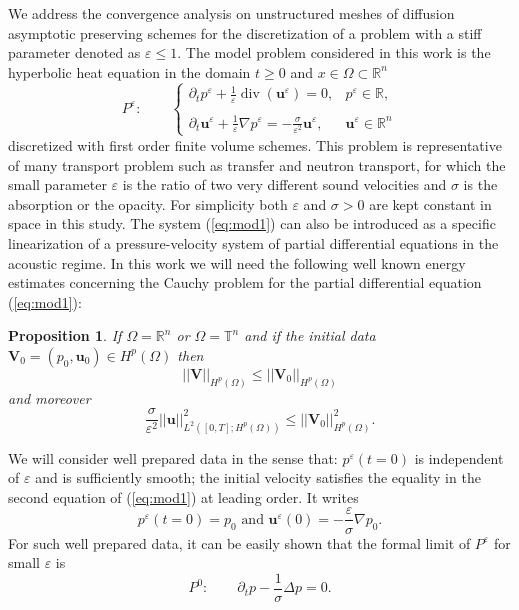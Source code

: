 \documentclass[a4paper,french,english,10pt]{article}
\newcommand\uu{\mathbf{u}}
\newcommand\eps{\varepsilon}
\newcommand{\ds}{\displaystyle}
\newcommand\V{\mathbf{V}}
\newtheorem{proposition}[theorem]{Proposition}
\begin{document}
We address the convergence analysis  on unstructured meshes
of diffusion
asymptotic preserving schemes for the discretization
of a problem with a stiff parameter denoted as $\eps\leq 1$.
The model problem considered in this work
is  the hyperbolic heat equation in the domain 
$t\geq 0$ and  $x\in \Omega\subset \mathbb R^n$
\begin{equation} \label{eq:mod1}
P^\varepsilon: \qquad 
\left\{\begin{array}{ll}
\ds\partial_t p^{\eps}+\frac{1}{\eps}\operatorname{div}(\uu^{\eps})=0,
& p^{\eps}\in \mathbb R, \\
\\
\ds\partial_t \uu^{\eps}+\frac{1}{\eps}\nabla
p^{\eps}=-\frac{\sigma}{\eps^2}\uu^{\eps},
& \uu^{\eps}  \in \mathbb R^n
 \end{array}\right.
\end{equation}
discretized with first order finite volume schemes.
This problem is representative
of many  transport problem such
as transfer and neutron transport,  for which the small parameter
$\eps$ is the ratio of two very different sound velocities and
$\sigma$ is the absorption or the opacity.
For simplicity both $\eps$ and  $\sigma>0$ are kept constant in space in this study.
The system (\ref{eq:mod1}) can also be introduced as a specific linearization
of a pressure-velocity system of partial differential equations
in the acoustic regime. In this work we will need the following well known energy estimates concerning 
the Cauchy problem for the partial differential equation (\ref{eq:mod1}): 
\begin{proposition}\label{bee}
If $\Omega= \mathbb R^n$ or $\Omega= \mathbb T^n$ and if the initial data $\V_0=(p_0,\uu_0) \in H^p( \Omega)$ then
\begin{equation}\label{bee1}
\vert\vert \V \vert \vert_{H^p( \Omega)}\leq \vert\vert \V_0 \vert \vert_{H^p( \Omega)}
\end{equation}
 and moreover 
\begin{equation}\label{bee2}
\frac{\sigma}{\eps^2}\vert\vert \uu \vert \vert^2_{L^2([0,T];H^p( \Omega))}\leq \vert\vert \V_0 \vert \vert^2_{H^p( \Omega)}.
\end{equation}
\end{proposition}
We will consider well prepared data in the sense that:
 $p^\eps(t=0)$
is independent of $\eps$ and is sufficiently smooth;
the initial velocity satisfies the equality in the second equation
of (\ref{eq:mod1}) at leading order. It writes 
\begin{equation} \label{eq:iniwp}
p^\eps(t=0)=p_0 \mbox{ and } 
\mathbf u^\eps(0)=-\frac\eps\sigma \nabla p_0.
\end{equation}
For such well prepared data, it can be easily shown that
the formal limit of $P^\varepsilon$ for small $\eps$ is
\begin{equation} \label{eq:mod2}
P^0: \qquad
\partial_t p - \frac1\sigma \Delta p=0. 
\end{equation}
\end{document}

